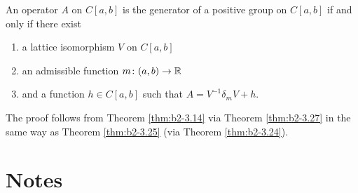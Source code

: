 \begin{theorem}\label{thm:b2-3.28}
%
An operator $A$ on $C[a,b]$ is the generator of a positive group on $C[a,b]$ if and only if there exist
\begin{enumerate}[\upshape (i)]
\item 
a lattice isomorphism $V$ on $C[a,b]$
\item 
an admissible function $m \colon (a,b) \to \mathbb{R}$
\item 
and a function $h \in C[a,b]$ such that $A = V^{-1}\delta_{m}V + h$.
\end{enumerate}
\end{theorem}

The proof follows from Theorem \ref{thm:b2-3.14} via Theorem \ref{thm:b2-3.27} in the same way as Theorem \ref{thm:b2-3.25} (via Theorem \ref{thm:b2-3.24}).
\section*{Notes}

